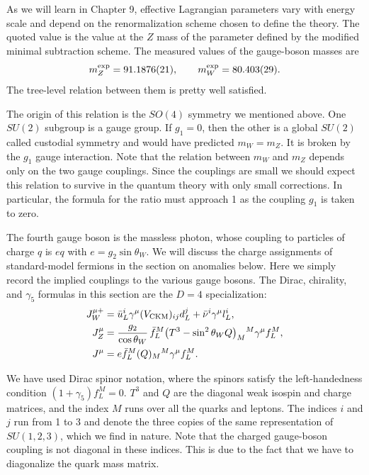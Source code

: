 As we will learn in Chapter 9, effective Lagrangian parameters vary with
energy scale and depend on the renormalization scheme chosen to define the
theory. The quoted value is the value at the $Z$ mass of the parameter defined
by the modified minimal subtraction scheme. The measured values of the
gauge-boson masses are
\begin{equation*}
  m_Z^{\rm exp}=91.1876(21),
  \qquad m_W^{\rm exp}=80.403(29).
\end{equation*}
The tree-level relation between them is pretty well satisfied.

The origin of this relation is the $SO(4)$ symmetry we mentioned above. One
$SU(2)$ subgroup is a gauge group. If $g_1=0$, then the other is a global
$SU(2)$ called custodial symmetry and would have predicted $m_W=m_Z$. It is
broken by the $g_1$ gauge interaction. Note that the relation between $m_W$
and $m_Z$ depends only on the two gauge couplings. Since the couplings are
small we should expect this relation to survive in the quantum theory with
only small corrections. In particular, the formula for the ratio must approach
1 as the coupling $g_1$ is taken to zero.

The fourth gauge boson is the massless photon, whose coupling to particles of
charge $q$ is $eq$ with $e=g_2\sin\theta_W$. We will discuss the charge
assignments of standard-model fermions in the section on anomalies below. Here
we simply record the implied couplings to the various gauge bosons. The Dirac,
chirality, and $\gamma_5$ formulas in this section are the $D=4$ specialization:
\begin{equation*}
\begin{aligned}
  J_W^{\mu+}&=\bar u_L^i\gamma^\mu(V_{\rm CKM})_{ij}d_L^j
    +\bar\nu^i\gamma^\mu l_L^i,\\
  J_Z^\mu&=\frac{g_2}{\cos\theta_W}\,
    \bar f_L^M\bigl(T^3-\sin^2\theta_W Q\bigr)_M{}^M\gamma^\mu f_L^M,\\
  J^\mu&=e\bar f_L^M(Q)_M{}^M\gamma^\mu f_L^M.
\end{aligned}
\end{equation*}

We have used Dirac spinor notation, where the spinors satisfy the
left-handedness condition $(1+\gamma_5)f_L^M=0$. $T^3$ and $Q$ are the
diagonal weak isospin and charge matrices, and the index $M$ runs over all the
quarks and leptons. The indices $i$ and $j$ run from 1 to 3 and denote the
three copies of the same representation of $SU(1,2,3)$, which we find in
nature. Note that the charged gauge-boson coupling is not diagonal in these
indices. This is due to the fact that we have to diagonalize the quark mass
matrix.

